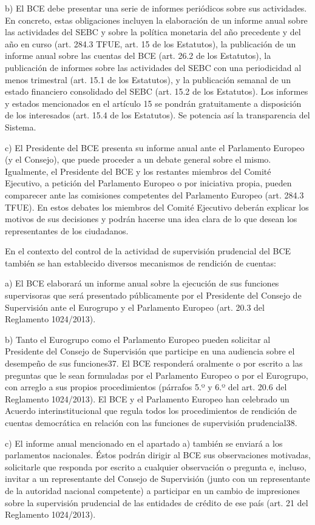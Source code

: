 \documentclass[10pt,a4paper]{article}
\begin{document}
b) El BCE debe presentar una serie de informes periódicos sobre sus actividades. En concreto, estas obligaciones incluyen la elaboración de un informe anual sobre las actividades del SEBC y sobre la política monetaria del año precedente y del año en curso (art. 284.3 TFUE, art. 15 de los Estatutos), la publicación de un informe anual sobre las cuentas del BCE (art. 26.2 de los Estatutos), la publicación de informes sobre las actividades del SEBC con una periodicidad al menos trimestral (art. 15.1 de los Estatutos), y la publicación semanal de un estado financiero consolidado del SEBC (art. 15.2 de los Estatutos). Los informes y estados mencionados en el artículo 15 se pondrán gratuitamente a disposición de los interesados (art. 15.4 de los Estatutos). Se potencia así la transparencia del Sistema.

c) El Presidente del BCE presenta su informe anual ante el Parlamento Europeo (y el Consejo), que puede proceder a un debate general sobre el mismo. Igualmente, el Presidente del BCE y los restantes miembros del Comité Ejecutivo, a petición del Parlamento Europeo o por iniciativa propia, pueden comparecer ante las comisiones competentes del Parlamento Europeo (art. 284.3 TFUE). En estos debates los miembros del Comité Ejecutivo deberán explicar los motivos de sus decisiones y podrán hacerse una idea clara de lo que desean los representantes de los ciudadanos.

En el contexto del control de la actividad de supervisión prudencial del BCE también se han establecido diversos mecanismos de rendición de cuentas: 

a) El BCE elaborará un informe anual sobre la ejecución de sus funciones supervisoras que será presentado públicamente por el Presidente del Consejo de Supervisión ante el Eurogrupo y el Parlamento Europeo (art. 20.3 del Reglamento 1024/2013).

b) Tanto el Eurogrupo como el Parlamento Europeo pueden solicitar al Presidente del Consejo de Supervisión que participe en una audiencia sobre el desempeño de sus funciones37. El BCE responderá oralmente o por escrito a las preguntas que le sean formuladas por el Parlamento Europeo o por el Eurogrupo, con arreglo a sus propios procedimientos (párrafos 5.º y 6.º del art. 20.6 del Reglamento 1024/2013). El BCE y el Parlamento Europeo han celebrado un Acuerdo interinstitucional que regula todos los procedimientos de rendición de cuentas democrática en relación con las funciones de supervisión prudencial38.

c) El informe anual mencionado en el apartado a) también se enviará a los parlamentos nacionales. Éstos podrán dirigir al BCE sus observaciones motivadas, solicitarle que responda por escrito a cualquier observación o pregunta e, incluso, invitar a un representante del Consejo de Supervisión (junto con un representante de la autoridad nacional competente) a participar en un cambio de impresiones sobre la supervisión prudencial de las entidades de crédito de ese país (art. 21 del Reglamento 1024/2013).
\end{document}
